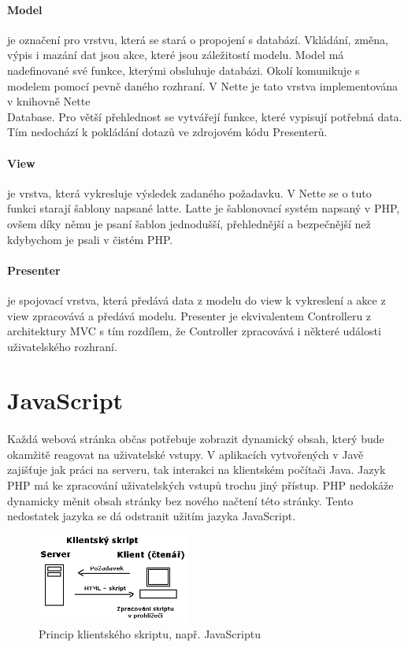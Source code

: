 \documentclass[11pt,a4paper,titlepage,oneside]{book}
\begin{document}
				\paragraph{Model} je označení pro vrstvu, která se stará o propojení s databází. Vkládání, změna, výpis i mazání dat jsou akce, které jsou záležitostí modelu. Model má nadefinované své funkce, kterými obsluhuje databázi. Okolí komunikuje s modelem pomocí pevně daného rozhraní. V Nette je tato vrstva implementována v knihovně Nette\\Database. Pro větší přehlednost se vytvářejí funkce, které vypisují potřebná data. Tím nedochází k pokládání dotazů ve zdrojovém kódu Presenterů.
				\paragraph{View} je vrstva, která vykresluje výsledek zadaného požadavku. V Nette se o tuto funkci starají šablony napsané latte. Latte je šablonovací systém napsaný v PHP, ovšem díky němu je psaní šablon jednodušší, přehlednější a bezpečnější než kdybychom je psali v čistém PHP.
				\paragraph{Presenter} je spojovací vrstva, která předává data z modelu do view k vykreslení a akce z view zpracovává a předává modelu. Presenter je ekvivalentem Controlleru z architektury MVC s tím rozdílem, že Controller zpracovává i některé události uživatelského rozhraní.

	\section{JavaScript} %
		\paragraph{} Každá webová stránka občas potřebuje zobrazit dynamický obsah, který bude okamžitě reagovat na uživatelské vstupy. V aplikacích vytvořených v Javě zajišťuje jak práci na serveru, tak interakci na klientském počítači Java. Jazyk PHP má ke zpracování uživatelských vstupů trochu jiný přístup. PHP nedokáže dynamicky měnit obsah stránky bez nového načtení této stránky. Tento nedostatek jazyka se dá odstranit užitím jazyka JavaScript.
		\begin{figure}[!h]
			\begin{center}
				\includegraphics[width=5cm]{obrazky/klient_skript.png}
				\caption{Princip klientského skriptu, např. JavaScriptu}
				\label{fig:client}
			\end{center}
		\end{figure}	
\end{document}
